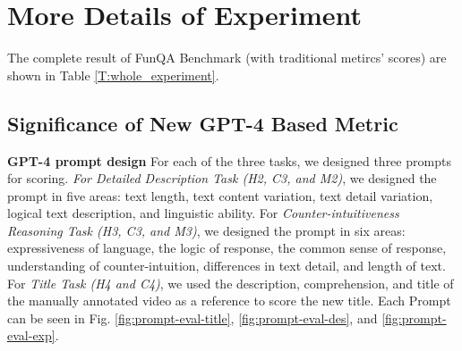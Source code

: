 
\section{More Details of Experiment} \label{appendix_d: Experiments}
The complete result of FunQA Benchmark (with traditional metircs' scores) are shown in Table \ref{T:whole_experiment}.
\subsection{Significance of New GPT-4 Based Metric} \label{appendix_d: Evaluation Metrics}
\noindent\textbf{GPT-4 prompt design}\quad 
For each of the three tasks, we designed three prompts for scoring. \textit{For Detailed Description Task (H2, C3, and M2)}, we designed the prompt in five areas: text length, text content variation, text detail variation, logical text description, and linguistic ability.
For \textit{Counter-intuitiveness Reasoning Task (H3, C3, and M3)}, we designed the prompt in six areas: expressiveness of language, the logic of response, the common sense of response, understanding of counter-intuition, differences in text detail, and length of text.
For \textit{Title Task (H4 and C4)}, we used the description, comprehension, and title of the manually annotated video as a reference to score the new title. Each Prompt can be seen in Fig. \ref{fig:prompt-eval-title}, \ref{fig:prompt-eval-des}, and \ref{fig:prompt-eval-exp}.

